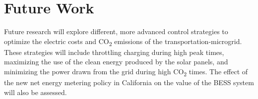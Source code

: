 \documentclass[conference]{IEEEtran}
\begin{document}
	\section{Future Work}
		  Future research will explore different, more advanced control strategies to optimize the electric costs and CO\textsubscript{2} emissions of the transportation-microgrid. These strategies will include throttling charging during high peak times, maximizing the use of the clean energy produced by the solar panels, and minimizing the power drawn from the grid during high CO\textsubscript{2} times. The effect of the new net energy metering policy in California on the value of the BESS system will also be assessed.
		
		
		
\end{document}
